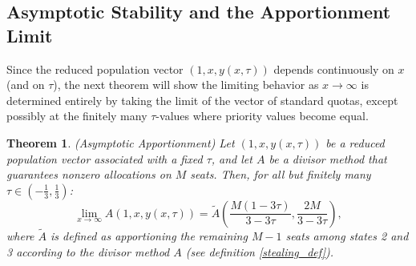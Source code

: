 \documentclass[11pt]{article}
\newtheorem{theorem}{Theorem}[section]
\theoremstyle{definition}
\theoremstyle{definition}
\begin{document}
\subsection{Asymptotic Stability and the Apportionment Limit}
Since the reduced population vector $(1,x,y(x,\tau))$ depends continuously on $x$ (and on $\tau$), the next theorem will show the limiting behavior as $x \to \infty$ is determined entirely by taking the limit of the vector of standard quotas, except possibly at the finitely many $\tau$-values where priority values become equal. 

\begin{theorem}\label{tau_limit_thm1}(Asymptotic Apportionment) Let $(1,x,y(x,\tau))$ be a reduced population vector associated with a fixed $\tau$, and let $A$ be a divisor method that guarantees nonzero allocations on $M$ seats. Then, for all but finitely many $\tau \in (-\frac13,\frac13)$: $$\displaystyle{\lim_{x \to \infty} A(1,x,y(x,\tau)) = \tilde{A} \left( \frac{M(1-3\tau)}{3-3\tau},\frac{2M}{3-3\tau} \right)},$$ where $\tilde{A}$ is defined as apportioning the remaining $M-1$ seats among states 2 and 3 according to the divisor method $A$ (see definition \ref{stealing_def}).
\end{theorem}
\end{document}
